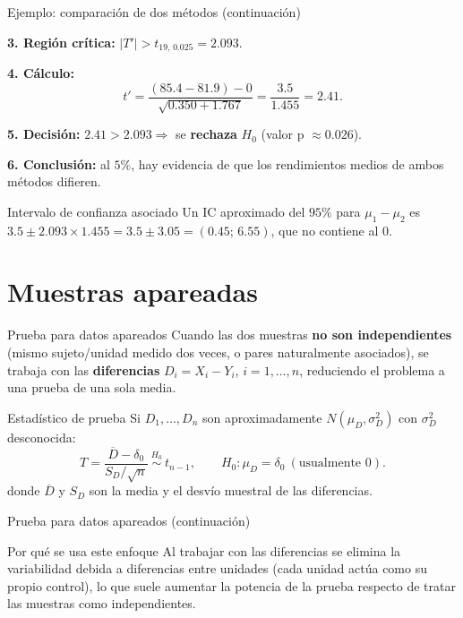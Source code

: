 \documentclass[aspectratio=169,11pt]{beamer}
\begin{document}
\begin{frame}{Ejemplo: comparación de dos métodos (continuación)}
\begin{example}
\textbf{3. Región crítica:} $|T'|>t_{19,\,0.025}=2.093$.

\textbf{4. Cálculo:}
\[
t'=\frac{(85.4-81.9)-0}{\sqrt{0.350+1.767}}=\frac{3.5}{1.455}=2.41.
\]

\textbf{5. Decisión:} $2.41>2.093\Rightarrow$ se \textbf{rechaza} $H_0$ (valor p $\approx0.026$).

\textbf{6. Conclusión:} al $5\%$, hay evidencia de que los rendimientos medios de ambos métodos difieren.
\end{example}

\begin{block}{Intervalo de confianza asociado}
Un IC aproximado del $95\%$ para $\mu_1-\mu_2$ es $3.5\pm2.093\times1.455=3.5\pm3.05=(0.45;\,6.55)$, que no contiene al $0$.
\end{block}
\end{frame}

\section{Muestras apareadas}

\begin{frame}{Prueba para datos apareados}
Cuando las dos muestras \textbf{no son independientes} (mismo sujeto/unidad medido dos veces, o pares naturalmente asociados), se trabaja con las \textbf{diferencias} $D_i=X_i-Y_i$, $i=1,\dots,n$, reduciendo el problema a una prueba de una sola media.

\begin{block}{Estadístico de prueba}
Si $D_1,\dots,D_n$ son aproximadamente $N(\mu_D,\sigma_D^2)$ con $\sigma_D^2$ desconocida:
\[
T=\frac{\overline{D}-\delta_0}{S_D/\sqrt{n}} \ \overset{H_0}{\sim}\ t_{n-1}, \qquad H_0:\mu_D=\delta_0 \ (\text{usualmente } 0).
\]
donde $\overline{D}$ y $S_D$ son la media y el desvío muestral de las diferencias.
\end{block}

\end{frame}

\begin{frame}{Prueba para datos apareados (continuación)}
\begin{alertblock}{Por qué se usa este enfoque}
Al trabajar con las diferencias se elimina la variabilidad debida a diferencias entre unidades (cada unidad actúa como su propio control), lo que suele aumentar la potencia de la prueba respecto de tratar las muestras como independientes.
\end{alertblock}
\end{frame}
\end{document}
